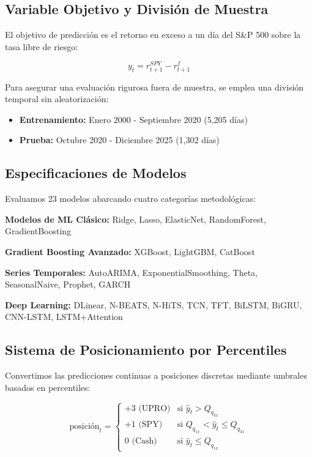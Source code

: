 \documentclass[11pt,a4paper]{article}
\begin{document}
\subsection{Variable Objetivo y Divisi\'on de Muestra}

El objetivo de predicci\'on es el retorno en exceso a un d\'ia del S\&P 500 sobre la tasa libre de riesgo:

\begin{equation}
y_t = r_{t+1}^{SPY} - r_{t+1}^{f}
\end{equation}

Para asegurar una evaluaci\'on rigurosa fuera de muestra, se emplea una divisi\'on temporal sin aleatorizaci\'on:
\begin{itemize}[noitemsep]
    \item \textbf{Entrenamiento:} Enero 2000 - Septiembre 2020 (5,205 d\'ias)
    \item \textbf{Prueba:} Octubre 2020 - Diciembre 2025 (1,302 d\'ias)
\end{itemize}

\subsection{Especificaciones de Modelos}

Evaluamos 23 modelos abarcando cuatro categor\'ias metodol\'ogicas:

\textbf{Modelos de ML Cl\'asico:} Ridge, Lasso, ElasticNet, RandomForest, GradientBoosting

\textbf{Gradient Boosting Avanzado:} XGBoost, LightGBM, CatBoost

\textbf{Series Temporales:} AutoARIMA, ExponentialSmoothing, Theta, SeasonalNaive, Prophet, GARCH

\textbf{Deep Learning:} DLinear, N-BEATS, N-HiTS, TCN, TFT, BiLSTM, BiGRU, CNN-LSTM, LSTM+Attention

\subsection{Sistema de Posicionamiento por Percentiles}

Convertimos las predicciones continuas a posiciones discretas mediante umbrales basados en percentiles:

\begin{equation}
\text{posici\'on}_t = \begin{cases}
+3 \text{ (UPRO)} & \text{si } \hat{y}_t > Q_{q_{3x}} \\
+1 \text{ (SPY)} & \text{si } Q_{q_{1x}} < \hat{y}_t \leq Q_{q_{3x}} \\
0 \text{ (Cash)} & \text{si } \hat{y}_t \leq Q_{q_{1x}}
\end{cases}
\end{equation}
\end{document}
